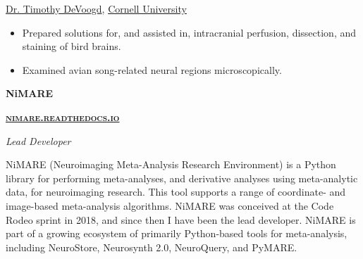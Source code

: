 \documentclass[10pt]{article}
\newcommand{\shorturl}[1]{\href{https://#1}{\textsc{#1}}}
\newcommand{\sectionstyle}{\LARGE \fontfamily{lmr}\selectfont}
\begin{document}
\href{http://www.psych.cornell.edu/people/faculty/devoogd-profile/}{Dr. Timothy DeVoogd},
\href{http://www.cornell.edu}{Cornell University}

\begin{itemize}[noitemsep, nolistsep]
\item
  Prepared solutions for, and assisted in, intracranial perfusion,
  dissection, and staining of bird brains.
\item
  Examined avian song-related neural regions microscopically.
\end{itemize}

\bigskip

\begin{center}\sectionstyle{SOFTWARE AND PROJECT DEVELOPMENT}\end{center}

\begin{samepage}
\begin{minipage}[t]{.5\linewidth}
	\flushleft
	\noindent
	\textbf{NiMARE}
\end{minipage}
\hfill
\begin{minipage}[t]{.5\linewidth}
	\flushright
	\noindent
	\textbf{\shorturl{nimare.readthedocs.io}}
\end{minipage}
\nopagebreak
\emph{Lead Developer}
\nopagebreak
\begin{adjustwidth}{2em}{0em}
	NiMARE (Neuroimaging Meta-Analysis Research Environment) is a Python library for performing meta-analyses,
	and derivative analyses using meta-analytic data, for neuroimaging research.
	This tool supports a range of coordinate- and image-based meta-analysis algorithms.
	NiMARE was conceived at the Code Rodeo sprint in 2018, and since then I have been the lead developer.
	NiMARE is part of a growing ecosystem of primarily Python-based tools for meta-analysis,
	including NeuroStore, Neurosynth 2.0, NeuroQuery, and PyMARE.
\end{adjustwidth}
\end{samepage}

\bigskip
\end{document}
